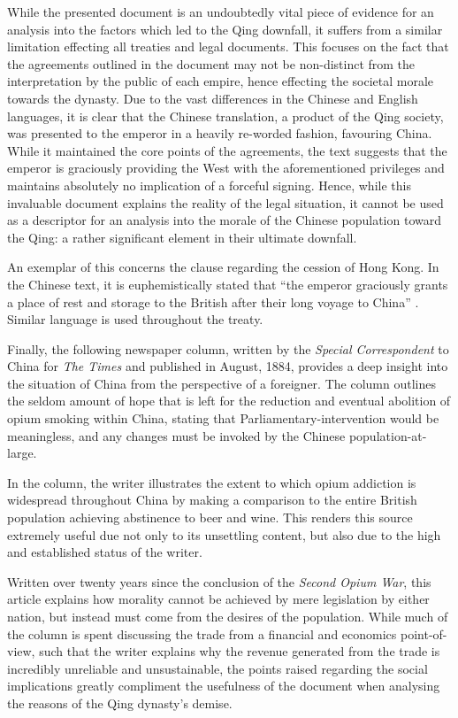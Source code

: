 \documentclass[a4paper,oneside]{article}
\begin{document}
        While the presented document is an undoubtedly vital piece of evidence for an analysis into the factors which led to the Qing downfall, it suffers from a similar limitation effecting all treaties and legal documents. This focuses on the fact that the agreements outlined in the document may not be non-distinct from the interpretation by the public of each empire, hence effecting the societal morale towards the dynasty. Due to the vast differences in the Chinese and English languages, it is clear that the Chinese translation, a product of the Qing society, was presented to the emperor in a heavily re-worded fashion, favouring China. While it maintained the core points of the agreements, the text suggests that the emperor is graciously providing the West with the aforementioned privileges and maintains absolutely no implication of a forceful signing. Hence, while this invaluable document explains the reality of the legal situation, it cannot be used as a descriptor for an analysis into the morale of the Chinese population toward the Qing: a rather significant element in their ultimate downfall.

        An exemplar of this concerns the clause regarding the cession of Hong Kong. In the Chinese text, it is euphemistically stated that ``the emperor graciously grants a place of rest and storage to the British after their long voyage to China'' \autocite{Zhang:2007}. Similar language is used throughout the treaty.

        Finally, the following newspaper column, written by the \textit{Special Correspondent} to China for \textit{The Times} and published in August, 1884, provides a deep insight into the situation of China from the perspective of a foreigner. The column outlines the seldom amount of hope that is left for the reduction and eventual abolition of opium smoking within China, stating that Parliamentary-intervention would be meaningless, and any changes must be invoked by the Chinese population-at-large.


        In the column, the writer illustrates the extent to which opium addiction is widespread throughout China by making a comparison to the entire British population achieving abstinence to beer and wine. This renders this source extremely useful due not only to its unsettling content, but also due to the high and established status of the writer.

        Written over twenty years since the conclusion of the \textit{Second Opium War}\footnotemark, this article explains how morality cannot be achieved by mere legislation by either nation, but instead must come from the desires of the population. While much of the column is spent discussing the trade from a financial and economics point-of-view, such that the writer explains why the revenue generated from the trade is incredibly unreliable and unsustainable, the points raised regarding the social implications greatly compliment the usefulness of the document when analysing the reasons of the Qing dynasty's demise.
\end{document}

